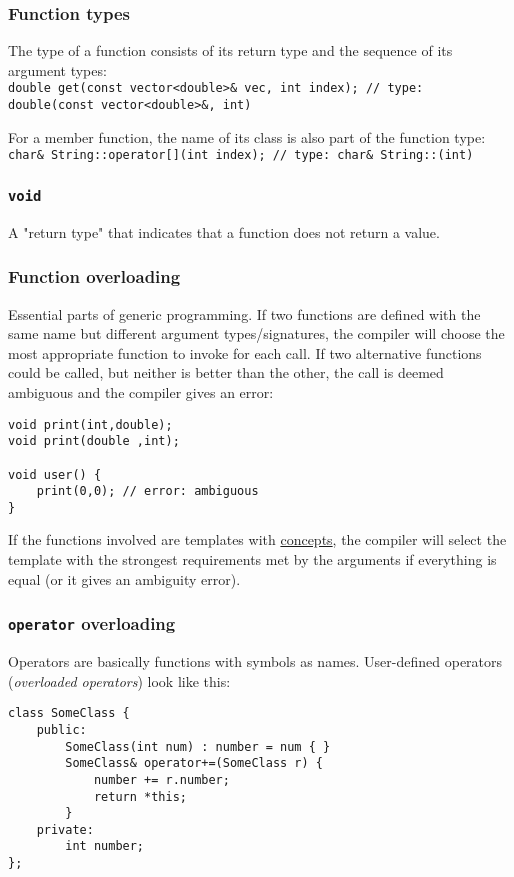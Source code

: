 \documentclass[8pt, table, xcdraw]{article}%
\begin{document}
\subsubsection{Function types}
The type of a function consists of its return type and the sequence of its argument types:\\
\lstinline{double get(const vector<double>& vec, int index); // type: double(const vector<double>&, int)}

For a member function, the name of its class is also part of the function type:\\
\lstinline{char& String::operator[](int index); // type: char& String::(int)}

\subsubsection{\lstinline{void}}
A "return type" that indicates that a function does not return a value.

\subsubsection{Function overloading}
Essential parts of generic programming. If two functions are defined with the same name but different argument types/signatures, the compiler will choose the most appropriate function to invoke for each call. If two alternative functions could be called, but neither is better than the other, the call is deemed ambiguous and the compiler gives an error:

\begin{lstlisting}
void print(int,double);
void print(double ,int);

void user() {
    print(0,0); // error: ambiguous
}
\end{lstlisting}

If the functions involved are templates with \hyperref[concepts]{concepts}, the compiler will select the template with the strongest requirements met by the arguments if everything is equal (or it gives an ambiguity error).

\subsubsection{\lstinline{operator} overloading}

Operators are basically functions with symbols as names. User-defined operators (\textit{overloaded operators}) look like this:

\begin{lstlisting}
class SomeClass {
    public:
        SomeClass(int num) : number = num { }
        SomeClass& operator+=(SomeClass r) {
            number += r.number;
            return *this;
        }
    private:
        int number;
};
\end{lstlisting}
\end{document}

